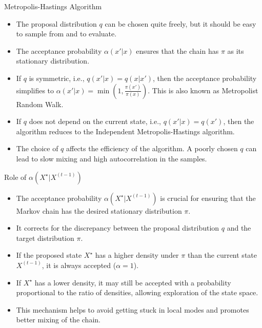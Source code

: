 \begin{frame}{Metropolis-Hastings Algorithm}
	\begin{itemize}
		\item The proposal distribution $q$ can be chosen quite freely, but it should be easy to sample from and to evaluate.
		\item The acceptance probability $\alpha(x'|x)$ ensures that the chain has $\pi$ as its stationary distribution.
		\item If $q$ is symmetric, i.e., $q(x'|x) = q(x|x')$, then the acceptance probability simplifies to $\alpha(x'|x) = \min\left(1, \frac{\pi(x')}{\pi(x)}\right)$. This is also known as Metropolist Random Walk.
		\item If $q$ does not depend on the current state, i.e., $q(x'|x) = q(x')$, then the algorithm reduces to the Independent Metropolis-Hastings algorithm.
		\item The choice of $q$ affects the efficiency of the algorithm. A poorly chosen $q$ can lead to slow mixing and high autocorrelation in the samples.
	\end{itemize}
\end{frame}

\begin{frame}{Role of $\alpha(X^{\star} | X^{(t-1)})$}
	\begin{itemize}
		\item The acceptance probability $\alpha(X^{\star} | X^{(t-1)})$ is crucial for ensuring that the Markov chain has the desired stationary distribution $\pi$.
		\item It corrects for the discrepancy between the proposal distribution $q$ and the target distribution $\pi$.
		\item If the proposed state $X^{\star}$ has a higher density under $\pi$ than the current state $X^{(t-1)}$, it is always accepted ($\alpha = 1$).
		\item If $X^{\star}$ has a lower density, it may still be accepted with a probability proportional to the ratio of densities, allowing exploration of the state space.
		\item This mechanism helps to avoid getting stuck in local modes and promotes better mixing of the chain.
	\end{itemize}
\end{frame}

